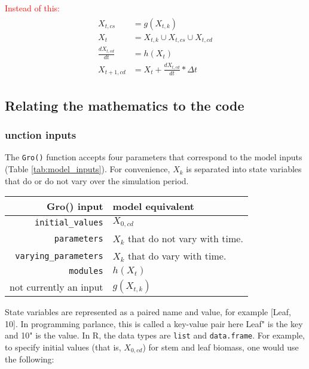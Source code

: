 \documentclass{article}
\newcommand{\code}[1]{\texttt{#1}}
\begin{document}
\textcolor{red}{Instead of this:}
\begin{align}
\label{eq:solver_loop}
\begin{split}
	X_{t,cs} &= g(X_{t,k}) \\
    X_t &= X_{t,k}  \cup X_{t,cs} \cup X_{t,cd} \\
    \frac{dX_{t,cd}}{dt} &= h(X_{t})  \\
    X_{t+1,cd} &= X_{t} + \frac{dX_{t,cd}}{dt} * \Delta t
\end{split}
\end{align}

\subsection{Relating the mathematics to the  code}
\subsubsection{unction inputs}

The \code{Gro()} function accepts four parameters that correspond to the model inputs (Table \ref{tab:model_inputs}). For convenience, $X_k$ is separated into state variables that do or do not vary over the simulation period.
% 
% 

\begin{table}[!htbp]
\begin{center}
\begin{tabular}{| r | l |}
	\hline
    \textbf{Gro() input} & \textbf{model equivalent} \\ 
    \hline
    \code{initial\_values} & $X_{0,cd}$ \\ 
    \code{parameters} & $X_k$ that do not vary with time. \\ 
    \code{varying\_parameters} & $X_k$ that do vary with time. \\ 
    \code{modules} & $h(X_{t})$ \\ 
    not currently an input & $g(X_{t,k})$ \\
    \hline
\end{tabular}
\end{center}
\end{table}

State variables are represented as a paired name and value, for example [Leaf, 10]. In programming parlance, this  is  called a key-value pair here Leaf" is the key and 10" is the value.  In R, the data types  are \code{list} and \code{data.frame}. For example, to specify initial values (that is, $X_{0,cd}$) for stem and leaf biomass, one would use the following:
\lstset{
  xleftmargin=0.05\textwidth, xrightmargin=.2\textwidth
}
\end{document}
